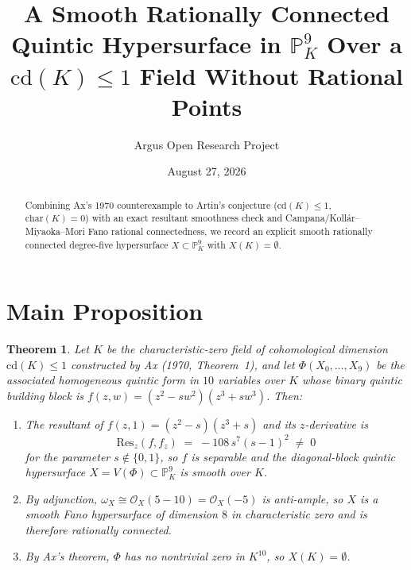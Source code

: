 \documentclass[10pt,reqno]{amsart}
\title[Smooth Rationally Connected Quintic Hypersurface Over a $\mathrm{cd}(K)\le 1$ Field]
{A Smooth Rationally Connected Quintic Hypersurface in $\mathbb{P}^9_K$ Over a $\mathrm{cd}(K)\le 1$ Field Without Rational Points}
\author{Argus Open Research Project}
\date{August 27, 2026}
\newtheorem{theorem}{Theorem}[section]
\theoremstyle{definition}
\begin{document}
\begin{abstract}
Combining Ax's 1970 counterexample to Artin's conjecture ($\mathrm{cd}(K)\le 1$, $\mathrm{char}(K)=0$) with an exact resultant smoothness check and Campana/Koll\'ar--Miyaoka--Mori Fano rational connectedness, we record an explicit smooth rationally connected degree-five hypersurface $X\subset\mathbb{P}^9_K$ with $X(K)=\emptyset$.
\end{abstract}
\maketitle
\section{Main Proposition}
\begin{theorem}
Let $K$ be the characteristic-zero field of cohomological dimension $\mathrm{cd}(K)\le 1$ constructed by Ax (1970, Theorem~1), and let $\Phi(X_0,\dots,X_9)$ be the associated homogeneous quintic form in $10$ variables over $K$ whose binary quintic building block is $f(z,w)=(z^2-sw^2)(z^3+sw^3)$. Then:
\begin{enumerate}[label=\textup{(\arabic*)}]
  \item The resultant of $f(z,1)=(z^2-s)(z^3+s)$ and its $z$-derivative is
  \[
    \mathrm{Res}_z(f, f_z) \;=\; -108\, s^7 (s-1)^2 \;\neq\; 0
  \]
  for the parameter $s\notin\{0,1\}$, so $f$ is separable and the diagonal-block quintic hypersurface $X = V(\Phi)\subset\mathbb{P}^9_K$ is smooth over $K$.
  \item By adjunction, $\omega_X \cong \mathcal{O}_X(5-10)=\mathcal{O}_X(-5)$ is anti-ample, so $X$ is a smooth Fano hypersurface of dimension $8$ in characteristic zero and is therefore rationally connected.
  \item By Ax's theorem, $\Phi$ has no nontrivial zero in $K^{10}$, so $X(K)=\emptyset$.
\end{enumerate}
\end{theorem}
\end{document}
